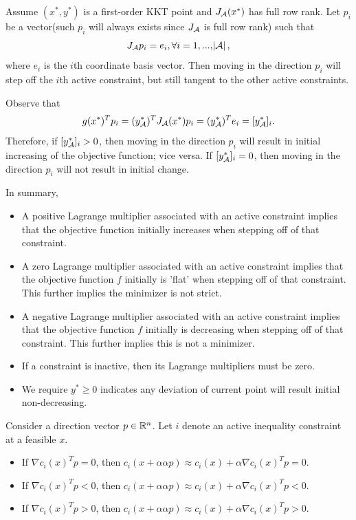 \begin{refsection}
\begin{note}\cite[lec 4]{Robinson2015nonlinear2}\label{ch:constrained-nonlinear-optimization:remark:interpretationLagrangeMultipliersInequalityConstraint}
Assume $(x^*,y^*)$ is a first-order KKT point and $J_{\mathcal{A}}(x^*)$ has full row rank. 
Let $p_i$ be a vector(such $p_i$ will always exists since $J_{\mathcal{A}}$ is full row rank) such that $$J_{\mathcal{A}}p_i = e_i,\forall i=1,...,\abs{\mathcal{A}},$$
where $e_i$ is the $i$th coordinate basis vector. Then moving in the direction $p_i$ will step off the $i$th active constraint, but still tangent to the other active constraints.

Observe that
$$g(x^*)^Tp_i = (y_{\mathcal{A}}^*)^TJ_{\mathcal{A}}(x^*)p_i = (y_{\mathcal{A}}^*)^Te_i = [y_{\mathcal{A}}^*]_i.$$
Therefore,
if $[y_{\mathcal{A}}^*]_i > 0$, then moving in the direction $p_i$ will result in initial increasing of the objective function; vice versa. If $[y_{\mathcal{A}}^*]_i = 0$, then moving in the direction $p_i$ will not result in initial change. 
	
In summary, 
	\begin{itemize}
		\item A positive Lagrange multiplier associated with an active constraint implies that the objective function initially increases when stepping off of that constraint.
		\item A zero Lagrange multiplier associated with an active constraint implies that the objective function $f$ initially is 'flat' when stepping off of that constraint. This further implies the minimizer is not strict.
		\item  A negative Lagrange multiplier associated with an active constraint implies that the objective function $f$ initially is decreasing when stepping off of that constraint. This further implies this is not a minimizer.
		\item If a constraint is inactive, then its Lagrange multipliers must be zero. 
		\item We require $y^*\geq 0$ indicates any deviation of current point will result initial non-decreasing.
	\end{itemize}
\end{note}




\begin{note}\hfill
Consider a direction vector $p\in \mathbb{R}^n$. Let $i$ denote an active inequality constraint at a feasible $x$. 
\begin{itemize}
	\item If $\nabla c_i(x)^T p = 0$, then $c_i(x + \alpha \alpha p) \approx c_i(x) + \alpha \nabla c_i(x)^T p = 0$. 
	\item If $\nabla c_i(x)^T p < 0$, then $c_i(x + \alpha \alpha p) \approx c_i(x) + \alpha \nabla c_i(x)^T p < 0$. 
	\item If $\nabla c_i(x)^T p > 0$, then $c_i(x + \alpha \alpha p) \approx c_i(x) + \alpha \nabla c_i(x)^T p > 0$. 
\end{itemize}
\end{note}




\end{refsection}

